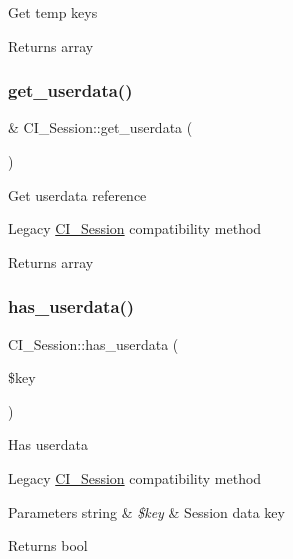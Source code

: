 Get temp keys

\begin{DoxyReturn}{Returns}
array 
\end{DoxyReturn}
\mbox{\label{class_c_i___session_ae570c1ad7563fee82f9c99ab5a22fb0a}} 
\subsubsection{\texorpdfstring{get\+\_\+userdata()}{get\_userdata()}}
{\footnotesize\ttfamily \& C\+I\+\_\+\+Session\+::get\+\_\+userdata (\begin{DoxyParamCaption}{ }\end{DoxyParamCaption})}

Get userdata reference

Legacy \mbox{\hyperlink{class_c_i___session}{C\+I\+\_\+\+Session}} compatibility method

\begin{DoxyReturn}{Returns}
array 
\end{DoxyReturn}
\mbox{\label{class_c_i___session_a5d793605b7edaf121ec5857b7256f3d2}} 
\subsubsection{\texorpdfstring{has\+\_\+userdata()}{has\_userdata()}}
{\footnotesize\ttfamily C\+I\+\_\+\+Session\+::has\+\_\+userdata (\begin{DoxyParamCaption}\item[{}]{\$key }\end{DoxyParamCaption})}

Has userdata

Legacy \mbox{\hyperlink{class_c_i___session}{C\+I\+\_\+\+Session}} compatibility method


\begin{DoxyParams}[1]{Parameters}
string & {\em \$key} & Session data key \\
\hline
\end{DoxyParams}
\begin{DoxyReturn}{Returns}
bool 
\end{DoxyReturn}
\mbox{\label{class_c_i___session_adf109663093a476b32b93e22e6b66401}} 
